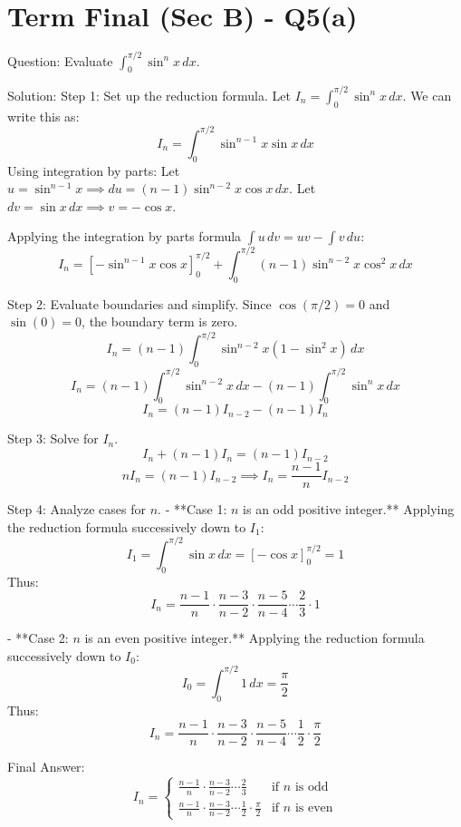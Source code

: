 \documentclass{article}
\begin{document}
\section*{Term Final (Sec B) - Q5(a)}
Question:
Evaluate $\int_0^{\pi/2} \sin^n x \, dx$.

Solution:
Step 1: Set up the reduction formula.
Let $I_n = \int_0^{\pi/2} \sin^n x \, dx$. We can write this as:
\[
I_n = \int_0^{\pi/2} \sin^{n-1} x \sin x \, dx
\]
Using integration by parts:
Let $u = \sin^{n-1} x \implies du = (n-1)\sin^{n-2} x \cos x \, dx$.
Let $dv = \sin x \, dx \implies v = -\cos x$.

Applying the integration by parts formula $\int u \, dv = uv - \int v \, du$:
\[
I_n = \left[ -\sin^{n-1} x \cos x \right]_0^{\pi/2} + \int_0^{\pi/2} (n-1)\sin^{n-2} x \cos^2 x \, dx
\]

Step 2: Evaluate boundaries and simplify.
Since $\cos(\pi/2) = 0$ and $\sin(0) = 0$, the boundary term is zero.
\[
I_n = (n-1) \int_0^{\pi/2} \sin^{n-2} x (1 - \sin^2 x) \, dx
\]
\[
I_n = (n-1) \int_0^{\pi/2} \sin^{n-2} x \, dx - (n-1) \int_0^{\pi/2} \sin^n x \, dx
\]
\[
I_n = (n-1) I_{n-2} - (n-1) I_n
\]

Step 3: Solve for $I_n$.
\[
I_n + (n-1) I_n = (n-1) I_{n-2}
\]
\[
n I_n = (n-1) I_{n-2} \implies I_n = \frac{n-1}{n} I_{n-2}
\]

Step 4: Analyze cases for $n$.
- **Case 1: $n$ is an odd positive integer.**
  Applying the reduction formula successively down to $I_1$:
  \[
  I_1 = \int_0^{\pi/2} \sin x \, dx = [-\cos x]_0^{\pi/2} = 1
  \]
  Thus:
  \[
  I_n = \frac{n-1}{n} \cdot \frac{n-3}{n-2} \cdot \frac{n-5}{n-4} \cdots \frac{2}{3} \cdot 1
  \]

- **Case 2: $n$ is an even positive integer.**
  Applying the reduction formula successively down to $I_0$:
  \[
  I_0 = \int_0^{\pi/2} 1 \, dx = \frac{\pi}{2}
  \]
  Thus:
  \[
  I_n = \frac{n-1}{n} \cdot \frac{n-3}{n-2} \cdot \frac{n-5}{n-4} \cdots \frac{1}{2} \cdot \frac{\pi}{2}
  \]

Final Answer:
\[
\boxed{I_n = 
\begin{cases} 
\frac{n-1}{n} \cdot \frac{n-3}{n-2} \cdots \frac{2}{3} & \text{if } n \text{ is odd} \\ 
\frac{n-1}{n} \cdot \frac{n-3}{n-2} \cdots \frac{1}{2} \cdot \frac{\pi}{2} & \text{if } n \text{ is even} 
\end{cases}}
\]
\end{document}
